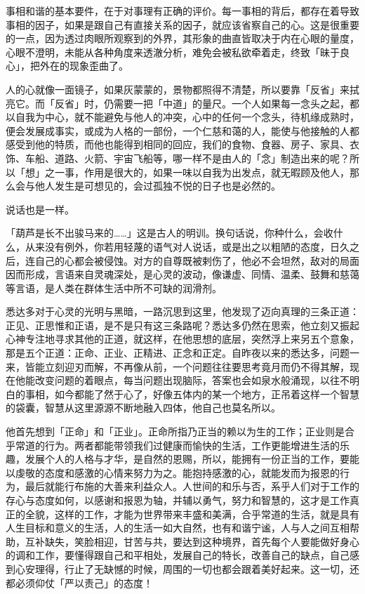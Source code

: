 \documentclass[twoside,openany]{book}
\begin{document}
事相和谐的基本要件，在于对事理有正确的评价。每一事相的背后，都存在着导致事相的因子，如果是跟自己有直接关系的因子，就应该省察自己的心。这是很重要的一点，因为透过肉眼所观察到的外界，其形象的曲直皆取决于内在心眼的量度，心眼不澄明，未能从各种角度来透澈分析，难免会被私欲牵着走，终致「昧于良心」，把外在的现象歪曲了。

人的心就像一面镜子，如果灰蒙蒙的，景物都照得不清楚，所以要靠「反省」来拭亮它。而「反省」时，仍需要一把「中道」的量尺。一个人如果每一念头之起，都以自我为中心，就不能避免与他人的冲突，心中的任何一个念头，待机缘成熟时，便会发展成事实，或成为人格的一部份，一个仁慈和蔼的人，能使与他接触的人都感受到他的特质，而他也能得到相同的回应，我们的食物、食器、房子、家具、衣饰、车船、道路、火箭、宇宙飞船等，哪一样不是由人的「念」制造出来的呢？所以「想」之一事，作用是很大的，如果一味以自我为出发点，就无暇顾及他人，那么会与他人发生是可想见的，会过孤独不悦的日子也是必然的。

说话也是一样。

「葫芦是长不出骏马来的……」这是古人的明训。换句话说，你种什么，会收什么，从来没有例外，你若用轻蔑的语气对人说话，或是出之以粗陋的态度，日久之后，连自己的心都会被侵蚀。对方的自尊既被剌伤了，他必不会坦然，敌对的局面因而形成，言语来自灵魂深处，是心灵的波动，像谦虚、同情、温柔、鼓舞和慈蔼等言语，是人类在群体生活中所不可缺的润滑剂。

悉达多对于心灵的光明与黑暗，一路沉思到这里，他发现了迈向真理的三条正道：正见、正思惟和正语，是不是只有这三条路呢？悉达多仍然在思索，他立刻又振起心神专注地寻求其他的正道，就这样，在他思想的底层，突然浮上来另五个意象，那是五个正道：正命、正业、正精进、正念和正定。自昨夜以来的悉达多，问题一来，皆能立刻迎刃而解，不再像从前，一个问题往往要思考竟月而仍不得其解，现在他能改变问题的着眼点，每当问题出现脑际，答案也会如泉水般涌现，以往不明白的事相，如今都能了然于心了，好像五体内的某一个地方，正吊着这样一个智慧的袋囊，智慧从这里源源不断地融入四体，他自己也莫名所以。

他首先想到「正命」和「正业」。正命所指乃正当的赖以为生的工作；正业则是合乎常道的行为。两者都能带领我们过健康而愉快的生活，工作更能增进生活的乐趣，发展个人的人格与才华，是自然的恩赐，所以，能拥有一份正当的工作，要能以虔敬的态度和感激的心情来努力为之。能抱持感激的心，就能发而为报恩的行为，最后就能行布施的大善来利益众人。人世间的和乐与否，系乎人们对于工作的存心与态度如何，以感谢和报恩为轴，并辅以勇气，努力和智慧的，这才是工作真正的全貌，这样的工作，才能为世界带来丰盛和美满，合乎常道的生活，就是具有人生目标和意义的生活，人的生活一如大自然，也有和谐宁谧，人与人之间互相帮助，互补缺失，笑脸相迎，甘苦与共，要达到这种境界，首先每个人要能做好身心的调和工作，要懂得跟自己和平相处，发展自己的特长，改善自己的缺点，自己感到心安理得，行止了无缺憾的时候，周围的一切也都会跟着美好起来。这一切，还都必须仰仗「严以责己」的态度！
\end{document}
